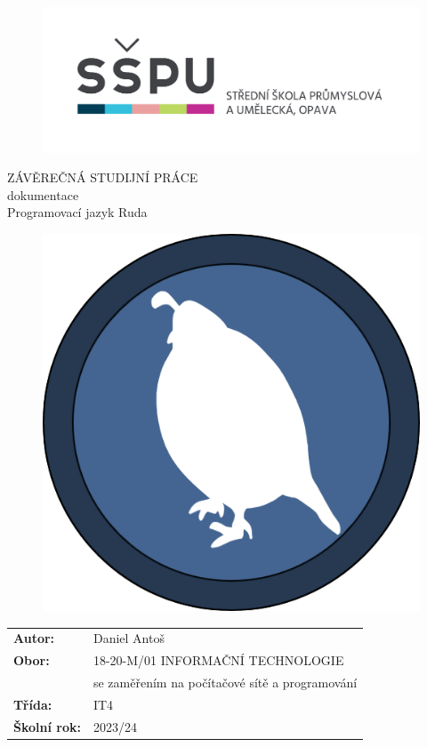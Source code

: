 \documentclass[12pt, a4paper,
twoside,        %
openright
]{report}
\title{\nazevPrace} %
\author{\jmenoAutora} %
\date{\datumOdevzdani} %
\newcommand\obor{INFORMAČNÍ TECHNOLOGIE} %
\newcommand\kodOboru{18-20-M/01} %
\newcommand\zamereni{se zaměřením na počítačové sítě a programování} %
\newcommand\trida{IT4} %
\newcommand\jmenoAutora{Daniel Antoš}  %
\newcommand\skolniRok{2023/24} %
\newcommand\nazevPrace{Programovací jazyk Ruda} %
\begin{document}
	
	\pagestyle{empty}
	
	\clearpage

	
	{\selectfont
		\begin{figure}[h]
			\centering
			\includegraphics[width=0.6\linewidth]{image/logo-skoly.png} 
		\end{figure}
		
		
		{\bfseries %
			\begin{center}
				\vspace{0.025 \textheight}
				\LARGE{ZÁVĚREČNÁ STUDIJNÍ PRÁCE}\\
				\large{dokumentace}\\
				\vspace{0.075 \textheight}
				\LARGE {\nazevPrace}\\
			\end{center}  
		}%
		
		\begin{figure}[h]
			\centering
			\includegraphics[width=0.5\linewidth]{image/logo.png} 
		\end{figure}
		
		\vspace{0.02 \textheight}
		\begin{table}[h!]
			\begin{tabular}{ll}
				\textbf{Autor:} & \jmenoAutora\\ 
				\textbf{Obor:} & \kodOboru { } \obor\\
				\textbf{} & \zamereni\\
				\textbf{Třída:} & \trida\\
				\textbf{Školní rok:} & \skolniRok\\
			\end{tabular}
			
		\end{table}		
	}
	
\end{document}
